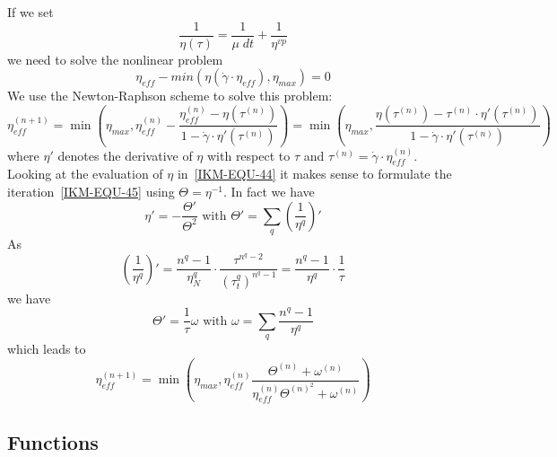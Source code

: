 If we set 
\begin{equation}\label{IKM-EQU-44}
\frac{1}{\eta(\tau)}= \frac{1}{\mu \; dt}+\frac{1}{\eta^{vp}}
\end{equation}
we need to solve the nonlinear problem
\begin{equation}
\eta_{eff} -  min(\eta( \dot{\gamma} \cdot \eta_{eff}) 
, \eta_{max}) =0 
\end{equation}
We use the Newton-Raphson scheme to solve this
problem:
\begin{equation}\label{IKM-EQU-45}
\eta_{eff}^{(n+1)} = \min(\eta_{max}, 
\eta_{eff}^{(n)} -
\frac{\eta_{eff}^{(n)} - \eta( \tau^{(n)}) }
{1-\dot{\gamma} \cdot \eta'( \tau^{(n)} )} )
=\min(\eta_{max},
\frac{\eta( \tau^{(n)}) -\tau^{(n)} \cdot  \eta'( \tau^{(n)} )  }
{1-\dot{\gamma} \cdot \eta'( \tau^{(n)} )} )
\end{equation} 
where $\eta'$ denotes the derivative of $\eta$ with respect to $\tau$
and $\tau^{(n)} = \dot{\gamma} \cdot \eta_{eff}^{(n)}$.
Looking at the evaluation of $\eta$ in~\ref{IKM-EQU-44} it makes sense to
formulate the iteration~\ref{IKM-EQU-45} using $\Theta=\eta^{-1}$.
In fact we have
\begin{equation}
\eta' = - \frac{\Theta'}{\Theta^2} 
\mbox{ with } 
\Theta' = \sum_{q} \left(\frac{1}{\eta^{q}} \right)'
\label{IKM iteration 7}
\end{equation} 
As
\begin{equation}\label{IKM-EQU-47}
\left(\frac{1}{\eta^{q}} \right)'
= \frac{n^{q}-1}{\eta^{q}_{N}} \cdot \frac{\tau^{n^{q}-2}}{(\tau_{t}^q)^{n^{q}-1}}
= \frac{n^{q}-1}{\eta^{q}}\cdot\frac{1}{\tau} 
\end{equation}
we have
\begin{equation}\label{IKM-EQU-48}
\Theta' = \frac{1}{\tau} \omega \mbox{ with } \omega = \sum_{q}\frac{n^{q}-1}{\eta^{q}} 
\end{equation}
which leads to
\begin{equation}\label{IKM-EQU-49}
\eta_{eff}^{(n+1)} = \min(\eta_{max}, 
\eta_{eff}^{(n)}
\frac{\Theta^{(n)}  + \omega^{(n)}  }
{\eta_{eff}^{(n)} \Theta^{(n)^2}+\omega^{(n)} })
\end{equation} 

\subsection{Functions}

